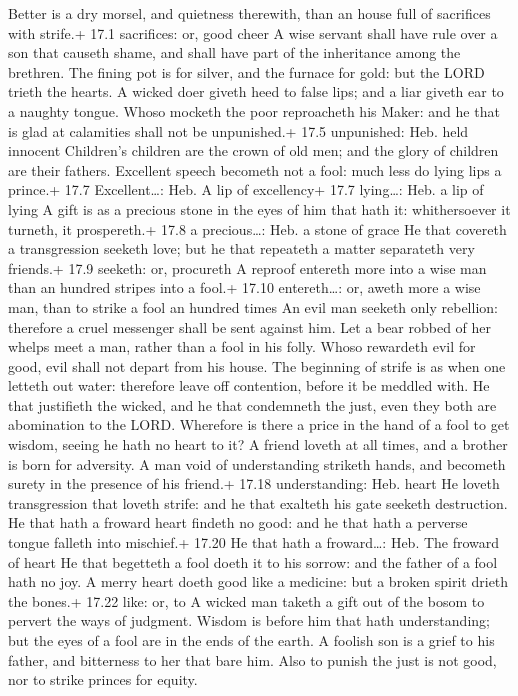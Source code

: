  Better is a dry morsel, and quietness therewith, than an
house full of sacrifices with strife.+ 17.1 sacrifices: or, good cheer
 A wise servant shall have rule over a son that causeth
shame, and shall have part of the inheritance among the brethren.
 The fining pot is for silver, and the furnace for gold: but
the LORD trieth the hearts.  A wicked doer giveth heed to
false lips; and a liar giveth ear to a naughty tongue. 
Whoso mocketh the poor reproacheth his Maker: and he that is glad at
calamities shall not be unpunished.+ 17.5 unpunished: Heb. held innocent
 Children's children are the crown of old men; and the glory
of children are their fathers.  Excellent speech becometh
not a fool: much less do lying lips a prince.+ 17.7 Excellent\ldots:
Heb. A lip of excellency+ 17.7 lying\ldots: Heb. a lip of lying
 A gift is as a precious stone in the eyes of him that hath
it: whithersoever it turneth, it prospereth.+ 17.8 a precious\ldots:
Heb. a stone of grace  He that covereth a transgression
seeketh love; but he that repeateth a matter separateth very friends.+
17.9 seeketh: or, procureth  A reproof entereth more into a
wise man than an hundred stripes into a fool.+ 17.10 entereth\ldots: or,
aweth more a wise man, than to strike a fool an hundred times
 An evil man seeketh only rebellion: therefore a cruel
messenger shall be sent against him.  Let a bear robbed of
her whelps meet a man, rather than a fool in his folly. 
Whoso rewardeth evil for good, evil shall not depart from his house.
 The beginning of strife is as when one letteth out water:
therefore leave off contention, before it be meddled with. 
He that justifieth the wicked, and he that condemneth the just, even
they both are abomination to the LORD.  Wherefore is there
a price in the hand of a fool to get wisdom, seeing he hath no heart to
it?  A friend loveth at all times, and a brother is born
for adversity.  A man void of understanding striketh hands,
and becometh surety in the presence of his friend.+ 17.18 understanding:
Heb. heart  He loveth transgression that loveth strife: and
he that exalteth his gate seeketh destruction.  He that
hath a froward heart findeth no good: and he that hath a perverse tongue
falleth into mischief.+ 17.20 He that hath a froward\ldots: Heb. The
froward of heart  He that begetteth a fool doeth it to his
sorrow: and the father of a fool hath no joy.  A merry
heart doeth good like a medicine: but a broken spirit drieth the bones.+
17.22 like: or, to  A wicked man taketh a gift out of the
bosom to pervert the ways of judgment.  Wisdom is before
him that hath understanding; but the eyes of a fool are in the ends of
the earth.  A foolish son is a grief to his father, and
bitterness to her that bare him.  Also to punish the just
is not good, nor to strike princes for equity.

